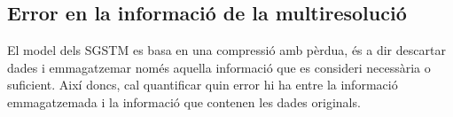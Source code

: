 





\subsection{Error en la informació de la multiresolució}

El model dels \gls{SGSTM} es basa en una compressió amb pèrdua, és a
dir descartar dades i emmagatzemar només aquella informació que es
consideri necessària o suficient. Així doncs, cal quantificar quin
error hi ha entre la informació emmagatzemada i la informació que
contenen les dades originals.


